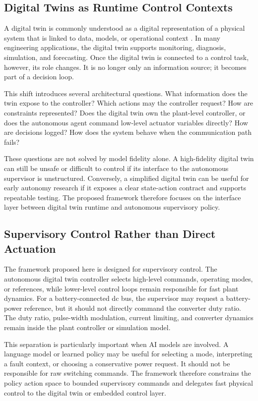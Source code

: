 \documentclass[conference]{IEEEtran}
\begin{document}
\subsection{Digital Twins as Runtime Control Contexts}

A digital twin is commonly understood as a digital representation of a
physical system that is linked to data, models, or operational context
\cite{dt_foundation,dt_survey}. In many engineering applications, the digital
twin supports monitoring, diagnosis, simulation, and forecasting. Once the
digital twin is connected to a control task, however, its role changes. It is
no longer only an information source; it becomes part of a decision loop.

This shift introduces several architectural questions. What information does
the twin expose to the controller? Which actions may the controller request?
How are constraints represented? Does the digital twin own the plant-level
controller, or does the autonomous agent command low-level actuator variables
directly? How are decisions logged? How does the system behave when the
communication path fails?

These questions are not solved by model fidelity alone. A high-fidelity
digital twin can still be unsafe or difficult to control if its interface to
the autonomous supervisor is unstructured. Conversely, a simplified digital
twin can be useful for early autonomy research if it exposes a clear
state-action contract and supports repeatable testing. The proposed framework
therefore focuses on the interface layer between digital twin runtime and
autonomous supervisory policy.

\subsection{Supervisory Control Rather than Direct Actuation}

The framework proposed here is designed for supervisory control. The
autonomous digital twin controller selects high-level commands, operating
modes, or references, while lower-level control loops remain responsible for
fast plant dynamics. For a battery-connected dc bus, the supervisor may
request a battery-power reference, but it should not directly command the
converter duty ratio. The duty ratio, pulse-width modulation, current
limiting, and converter dynamics remain inside the plant controller or
simulation model.

This separation is particularly important when AI models are involved. A
language model or learned policy may be useful for selecting a mode,
interpreting a fault context, or choosing a conservative power request. It
should not be responsible for raw switching commands. The framework therefore
constrains the policy action space to bounded supervisory commands and
delegates fast physical control to the digital twin or embedded control layer.
\end{document}
